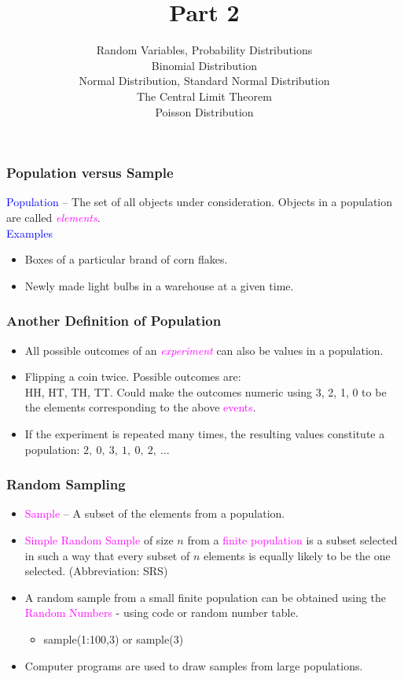 \documentclass[xcolor=dvipsnames,12pt]{beamer}
\title[]{Part 2}
\author[Stat 801]{Random Variables, Probability Distributions\\
Binomial Distribution\\
Normal Distribution, Standard Normal Distribution\\
The Central Limit Theorem\\
Poisson Distribution}
\date{}
\begin{document}
\begin{frame}[plain]
  \titlepage
\end{frame}


\begin{frame}
\frametitle{Population versus Sample}
\textcolor{blue}{Population} -- The set of all objects under consideration.
Objects in a population are called  \textcolor{magenta}{\textit{elements}}.\\
 \textcolor{blue}{Examples}
\begin{itemize}
\item  Boxes of a particular brand of corn flakes. 
\item  Newly made light bulbs in a warehouse at a given time.
\end{itemize}
\end{frame}



\begin{frame}
\frametitle{Another Definition of Population}
\begin{itemize}
\item All possible outcomes of an  \textcolor{magenta}{\textit{experiment}} can also be values
in a population.
\item Flipping a coin twice.  Possible outcomes are:\\ HH, HT, TH, TT.
Could  make the outcomes numeric using 3, 2, 1, 0 to be the elements
corresponding to the above \textcolor{magenta}{events}. 
\item If the experiment is repeated many times, the resulting values
constitute a population: $2,\ 0,\ 3,\ 1,\ 0,\ 2,\ \dots$
\end{itemize}
\end{frame}


\begin{frame}
\frametitle{Random Sampling}
\begin{itemize}
\item \textcolor{magenta}{Sample} -- A subset of the elements from a population.
\item \textcolor{magenta}{Simple Random Sample} of size $n$ from a \textcolor{magenta}{finite 
population} is a  subset selected in such a way that every subset of 
$n$ elements is equally likely to be the one selected. (Abbreviation: SRS)
\item A random sample from a small finite population can be obtained using the
\textcolor{magenta}{Random Numbers} - using code or random number table.
\begin{itemize}
\item sample(1:100,3) or sample(3)
\end{itemize}
\item Computer programs are used to draw samples from large populations.
\end{itemize}
\end{frame}
\end{document}
